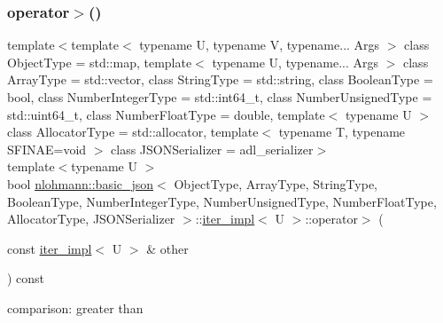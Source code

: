 \subsubsection{\texorpdfstring{operator$>$()}{operator>()}}
{\footnotesize\ttfamily template$<$template$<$ typename U, typename V, typename... Args $>$ class Object\+Type = std\+::map, template$<$ typename U, typename... Args $>$ class Array\+Type = std\+::vector, class String\+Type  = std\+::string, class Boolean\+Type  = bool, class Number\+Integer\+Type  = std\+::int64\+\_\+t, class Number\+Unsigned\+Type  = std\+::uint64\+\_\+t, class Number\+Float\+Type  = double, template$<$ typename U $>$ class Allocator\+Type = std\+::allocator, template$<$ typename T, typename S\+F\+I\+N\+A\+E=void $>$ class J\+S\+O\+N\+Serializer = adl\+\_\+serializer$>$ \\
template$<$typename U $>$ \\
bool \mbox{\hyperlink{classnlohmann_1_1basic__json}{nlohmann\+::basic\+\_\+json}}$<$ Object\+Type, Array\+Type, String\+Type, Boolean\+Type, Number\+Integer\+Type, Number\+Unsigned\+Type, Number\+Float\+Type, Allocator\+Type, J\+S\+O\+N\+Serializer $>$\+::\mbox{\hyperlink{classnlohmann_1_1basic__json_1_1iter__impl}{iter\+\_\+impl}}$<$ U $>$\+::operator$>$ (\begin{DoxyParamCaption}\item[{const \mbox{\hyperlink{classnlohmann_1_1basic__json_1_1iter__impl}{iter\+\_\+impl}}$<$ U $>$ \&}]{other }\end{DoxyParamCaption}) const\hspace{0.3cm}{\ttfamily [inline]}}



comparison\+: greater than 

